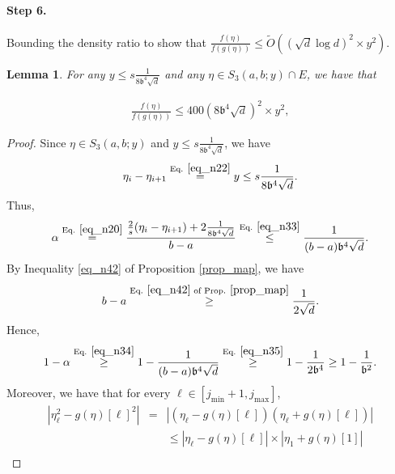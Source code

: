 \documentclass[11pt,letterpaper]{article}
\newtheorem{lemma}[theorem]{Lemma}
\begin{document}
\paragraph{Step 6.} Bounding the density ratio to show that $    \frac{f(\eta)}{f(g(\eta))} \leq \tilde{O}((\sqrt{d} \log d )^2 \times y^2)$.


\begin{lemma}\label{lemma_density_ratio}
For any $y \leq s\frac{1}{8\mathfrak{b}^4\sqrt{d} }$ and any $\eta\in  S_3(a,b;y) \cap E$, we have that

\begin{align*}
  \frac{f(\eta)}{f(g(\eta))} \leq 400 (8 \mathfrak{b}^4 \sqrt{d})^2 \times y^2,
\end{align*}
\end{lemma}

\begin{proof}
%
Since $\eta \in  S_3(a,b;y)$ and $y \leq s\frac{1}{8\mathfrak{b}^4\sqrt{d} }$, we have
%
\begin{equation}\label{eq_n33}
\eta_{i}- \eta_{i+1} \stackrel{\textrm{Eq. } \eqref{eq_n22}}{=} y \leq s\frac{1}{8\mathfrak{b}^4\sqrt{d} }.
\end{equation}
Thus, 
%
\begin{equation}\label{eq_n34}
\alpha \stackrel{\textrm{Eq. } \eqref{eq_n20}}{=} \frac{ \frac{2}{s}(\eta_{i}- \eta_{i+1}) +2\frac{1}{8\mathfrak{b}^4\sqrt{d}} }{b-a} \stackrel{\textrm{Eq. } \eqref{eq_n33}}{\leq}  \frac{1}{(b-a)\mathfrak{b}^4\sqrt{d}}.
\end{equation}
%
By Inequality \eqref{eq_n42} of Proposition \ref{prop_map}, we have
\begin{equation}\label{eq_n35}
    b-a  \stackrel{\textrm{Eq. } \eqref{eq_n42} \textrm{ of Prop. } \ref{prop_map}}{\geq} \frac{1}{2 \sqrt{d}}.
\end{equation}
%
Hence,
%
\begin{equation}\label{eq_b11}
    1-\alpha \stackrel{\textrm{Eq. } \eqref{eq_n34}}{\geq} 1- \frac{1}{(b-a)\mathfrak{b}^4\sqrt{d}} \stackrel{\textrm{Eq. } \eqref{eq_n35}}{\geq} 1- \frac{1}{2\mathfrak{b}^4} \geq 1- \frac{1}{\mathfrak{b}^2}.
\end{equation}
%
%
Moreover, we have that for every $\ell \in [j_{\mathrm{min}}+1,j_{\mathrm{max}}]$,
%
\begin{eqnarray}
  |\eta_{\ell}^2 - g(\eta)[\ell]^2| &=& |(\eta_{\ell} - g(\eta)[\ell])(\eta_{\ell} + g(\eta)[\ell])| \nonumber\\
%
 & & \leq  \left |\eta_{\ell} - g(\eta)[\ell]\right| \times \left|\eta_{1} + g(\eta)[1]\right|  \label{eq_n155}\\

\end{eqnarray}
\end{proof}
\end{document}
